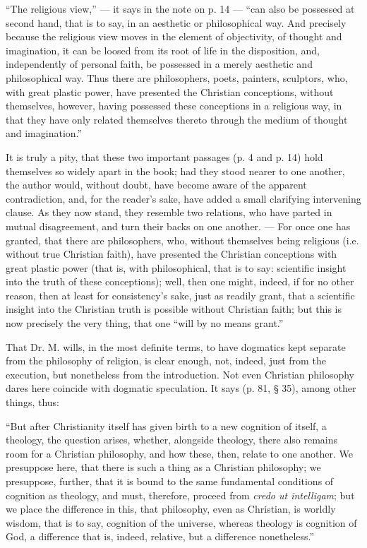 \documentclass[12pt]{book}
\begin{document}
``The religious view,'' --- it says in the note on p. 14 --- ``can also be possessed at second hand, that is to say, in an aesthetic or philosophical way. And precisely because the religious view moves in the element of objectivity, of thought and imagination, it can be loosed from its root of life in the disposition, and, independently of personal faith,
be possessed in a merely aesthetic and philosophical way. Thus there are philosophers, poets, painters, sculptors, who, with great plastic power, have presented the Christian conceptions, without themselves, however, having possessed these conceptions in a religious way, in that they have only related themselves thereto through the medium of thought and imagination.''

It is truly a pity, that these two important passages (p. 4 and p. 14) hold themselves so widely apart in the book; had they stood nearer to one another, the author would, without doubt, have become aware of the apparent contradiction, and, for the reader's sake, have added a small clarifying intervening clause. As they now stand, they resemble two relations, who have parted in mutual disagreement, and turn their backs on one another. --- For once one has granted, that there are philosophers, who, without themselves being religious (i.e. without true Christian faith), have presented the Christian conceptions with great plastic power (that is, with philosophical, that is to say: scientific insight into the truth of these conceptions); well, then one might, indeed, if for no other reason, then at least for consistency's sake, just as readily grant, that a scientific insight into the Christian truth is possible without Christian faith; but this is now precisely the very thing, that one ``will by no means grant.''

That Dr. M. wills, in the most definite terms, to have dogmatics kept separate from the philosophy of religion, is clear enough, not, indeed, just from the execution, but nonetheless from the introduction. Not even Christian philosophy dares here coincide
with dogmatic speculation. It says (p. 81, § 35), among other things, thus:

``But after Christianity itself has given birth to a new cognition of itself, a theology, the question arises, whether, alongside theology, there also remains room for a Christian philosophy, and how these, then, relate to one another. We presuppose here, that there is such a thing as a Christian philosophy; we presuppose, further, that it is bound to the same fundamental conditions of cognition as theology, and must, therefore, proceed from \textit{credo ut intelligam}; but we place the difference in this, that philosophy, even as Christian, is worldly wisdom, that is to say, cognition of the universe, whereas theology is cognition of God, a difference that is, indeed, relative, but a difference nonetheless.''
\end{document}
